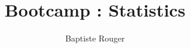 \documentclass[10pt,a4paper]{article}
\author{Baptiste Rouger}
\title{Bootcamp : Statistics}
\begin{document}
\maketitle

\begin{flushright}
\end{flushright}

\tableofcontents

\newpage
\end{document}
